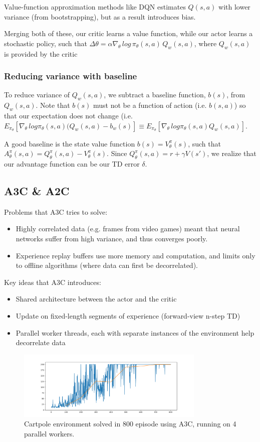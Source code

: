 \documentclass[11pt]{article} %
\begin{document}
Value-function approximation methods like DQN estimates $Q(s,a)$ with lower variance (from bootstrapping), but as a result introduces bias. 

Merging both of these, our critic learns a value function, while our actor learns a stochastic policy, such that $\Delta\theta = \alpha \nabla_\theta\, log\, \pi_\theta (s,a)\, Q_w(s,a)$, where $Q_w(s,a)$ is provided by the critic
\subsubsection{Reducing variance with baseline}
To reduce variance of $Q_w(s,a)$, we subtract a baseline function, $b(s)$, from $Q_w(s,a)$. Note that $b(s)$ must not be a function of action (i.e. $b(s,a)$) so that our expectation does not change (i.e. $E_{\pi_\theta}[\nabla_\theta\,log\pi_\theta(s,a)(Q_w(s,a)-b_w(s)] \equiv E_{\pi_\theta}[\nabla_\theta\,log\pi_\theta(s,a)Q_w(s,a)]$.

A good baseline is the state value function $b(s)=V^\pi_\theta(s)$, such that $A^\pi_\theta(s,a) = Q^\pi_\theta(s,a) - V^\pi_\theta(s)$. Since $Q^\pi_\theta(s,a)=r+\gamma V(s')$, we realize that our advantage function can be our TD error $\delta$.

\subsection{A3C \& A2C}
Problems that A3C tries to solve:
\begin{itemize}
    \item Highly correlated data (e.g. frames from video games) meant that neural networks suffer from high variance, and thus converges poorly.
    \item Experience replay buffers use more memory and computation, and limits only to offline algorithms (where data can first be decorrelated).
\end{itemize}
Key ideas that A3C introduces:
\begin{itemize}
    \item Shared architecture between the actor and the critic
    \item Update on fixed-length segments of experience (forward-view n-step TD)
    \item Parallel worker threads, each with separate instances of the environment help decorrelate data
\end{itemize}

\begin{figure}
    \centering
    \includegraphics[width=0.8\textwidth]{A3C/cartpole-MC/cartpole_800eps.png}
    \caption{Cartpole environment solved in 800 episode using A3C, running on 4 parallel workers.}
    \label{fig:my_label}
\end{figure}
\end{document}
